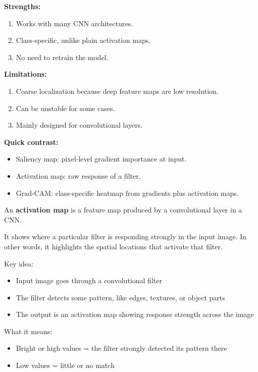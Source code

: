 \documentclass[12pt]{report}
\begin{document}
\textbf{Strengths:}
\begin{enumerate}
	\item Works with many CNN architectures.
	\item Class-specific, unlike plain activation maps.
	\item No need to retrain the model.
\end{enumerate}

\textbf{Limitations:}
\begin{enumerate}
	\item Coarse localization because deep feature maps are low resolution.
	\item Can be unstable for some cases.
	\item Mainly designed for convolutional layers.
\end{enumerate}

\textbf{Quick contrast:}
\begin{itemize}
	\item Saliency map: pixel-level gradient importance at input.
	\item Activation map: raw response of a filter.
	\item Grad-CAM: class-specific heatmap from gradients plus activation maps.
\end{itemize}



An \textbf{activation map} is a feature map produced by a convolutional layer in a CNN.

It shows where a particular filter is responding strongly in the input image. In other words, it highlights the spatial locations that activate that filter.

Key idea:
\begin{itemize}
	\item Input image goes through a convolutional filter
	\item The filter detects some pattern, like edges, textures, or object parts
	\item The output is an activation map showing response strength across the image
\end{itemize}

What it means:

\begin{itemize}
	\item Bright or high values = the filter strongly detected its pattern there
	\item Low values = little or no match
\end{itemize}
\end{document}
